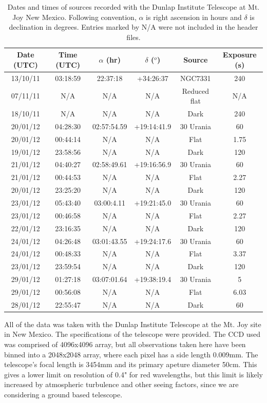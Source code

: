 \documentclass[a4paper,12pt]{article}
\begin{document}
\begin{table}[!htbp]
  \centering
  \begin{tabular}{c||c||c||c||c||c}
   Date (UTC) & Time (UTC) & $\alpha$ (hr) & $\delta$ ($^o$) & Source & Exposure (s)\\
   \hline
   \hline
   13/10/11 & 03:18:59 & 22:37:18 & +34:26:37 & NGC7331 & 240\\
   07/11/11 & N/A & N/A & N/A & Reduced flat & N/A \\
   18/10/11 & N/A & N/A & N/A & Dark & 240\\
   \hline
   20/01/12 & 04:28:30 & 02:57:54.59 & +19:14:41.9 & 30 Urania & 60\\
   20/01/12 & 00:44:14 & N/A & N/A & Flat & 1.75\\
   19/01/12 & 23:58:56 & N/A & N/A & Dark & 120\\
   \hline
   21/01/12 & 04:40:27 & 02:58:49.61 & +19:16:56.9 & 30 Urania & 60\\
   21/01/12 & 00:44:53 & N/A & N/A & Flat & 2.27\\
   20/01/12 & 23:25:20 & N/A & N/A & Dark & 120\\
   \hline
   23/01/12 & 05:43:40 & 03:00:4.11 & +19:21:45.0 & 30 Urania & 60\\
   23/01/12 & 00:46:58 & N/A & N/A & Flat & 2.27\\
   22/01/12 & 23:16:35 & N/A & N/A & Dark & 120\\
   \hline
   24/01/12 & 04:26:48 & 03:01:43.55 & +19:24:17.6 & 30 Urania & 60\\
   24/01/12 & 00:48:33 & N/A & N/A & Flat & 3.37\\
   23/01/12 & 23:59:54 & N/A & N/A & Dark & 120\\
   \hline
   29/01/12 & 01:27:18 & 03:07:01.64 & +19:38:19.4 & 30 Urania & 5\\
   29/01/12 & 00:56:08 & N/A & N/A & Flat & 6.03\\
   28/01/12 & 22:55:47 & N/A & N/A & Dark & 60\\
   \end{tabular}
    \caption{Dates and times of sources recorded with the Dunlap Institute Telescope at Mt. Joy New Mexico. Following convention, $\alpha$ is right ascension in hours and $\delta$ is declination in degrees. Entries marked by N/A were not included in the header files.}
    \label{tab:datatable}
\end{table}

All of the data was taken with the Dunlap Institute Telescope at the Mt. Joy site in New Mexico. The specifications of the telescope were provided. The CCD used was comprised of 4096x4096 array, but all observations taken here have been binned into a 2048x2048 array, where each pixel has a side length 0.009mm. The telescope's focal length is 3454mm and its primary apeture diameter 50cm. This gives a lower limit on resolution of 0.4" for red wavelengths, but this limit is likely increased by atmospheric turbulence and other seeing factors, since we are considering a ground based telescope.
\end{document}
